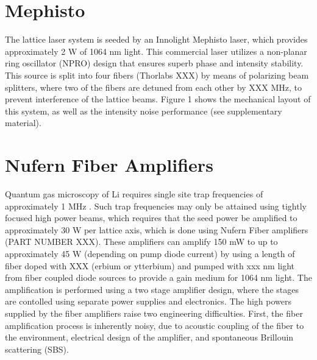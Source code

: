 \documentclass[twocolumn,aps,pra,showpacs,preprintnumbers,bibnotes]{revtex4-1}
\begin{document}
\section{Mephisto}
The lattice laser system is seeded by an Innolight Mephisto laser, which provides approximately 2 W of 1064 nm light. 
This commercial laser utilizes a non-planar ring oscillator (NPRO) design that ensures superb phase and intensity stability. This source is split into four fibers (Thorlabs XXX) by means of polarizing beam splitters, where two of the fibers are detuned from each other by XXX MHz, to prevent interference of the lattice beams. Figure 1 shows the mechanical layout of this system, as well as the intensity noise performance (see supplementary material).


\section{Nufern Fiber Amplifiers}
Quantum gas microscopy of Li requires single site trap frequencies of approximately 1 MHz \cite{single site paper}.
Such trap frequencies may only be attained using tightly focused high power beams, which requires that the seed power be amplified to approximately 30 W per lattice axis, which is done using Nufern Fiber amplifiers (PART NUMBER XXX).
These amplifiers can amplify 150 mW to up to approximately 45 W (depending on pump diode current) by using a length of fiber doped with XXX (erbium or ytterbium) and pumped with xxx nm light from fiber coupled diode sources to provide a gain medium for 1064 nm light. 
The amplification is performed using a two stage amplifier design, where the stages are contolled using separate power supplies and electronics.
The high powers supplied by the fiber amplifiers raise two engineering difficulties. First, the fiber amplification process is inherently noisy, due to acoustic coupling of the fiber to the environment, electrical design of the amplifier, and spontaneous Brillouin scattering (SBS). 
\end{document}
